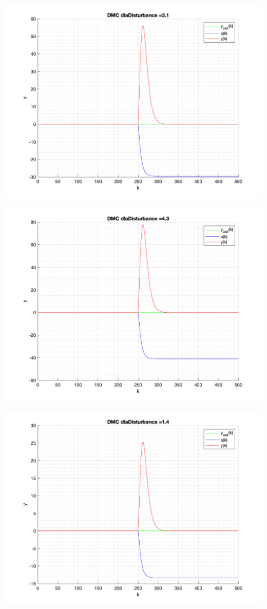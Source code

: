 \documentclass[a4paper, 11pt]{article}
\begin{document}
\begin{enumerate}
 \includegraphics[width=\linewidth]{./ModelsP4_Disturbance/P4_DMC_Disturbance_3_1_png.png} 
 
 \includegraphics[width=\linewidth]{./ModelsP4_Disturbance/P4_DMC_Disturbance_4_3_png.png} 
 
 \includegraphics[width=\linewidth]{./ModelsP4_Disturbance/P4_DMC_Disturbance_1_4_png.png} 
 

\end{enumerate}
\end{document}
